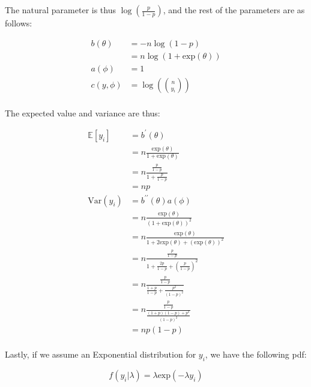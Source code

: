 \documentclass{report}
\begin{document}
The natural parameter is thus $\log\left(\frac{p}{1-p}\right)$, and the rest of the parameters are as follows:

\begin{equation}\label{eq:ex-glm-binomial-dist-params}
    \begin{aligned}
        b(\theta)
          &= -n \log(1 - p) \\
          &= n \log(1 + \text{exp}(\theta)) \\
        a(\phi) &= 1 \\
        c(y, \phi) &= \log\left(\binom{n}{y_i}\right) \\
    \end{aligned}
\end{equation}

The expected value and variance are thus:

\begin{equation}\label{eq:ex-glm-binomial-dist-mean-var}
    \begin{aligned}
        \mathbb{E}[y_i]
          &= b^\prime(\theta) \\
          &= n \frac{\text{exp}(\theta)}{1 + \text{exp}(\theta)} \\
          &= n \frac{\frac{p}{1-p}}{1 + \frac{p}{1-p}} \\
          &= np \\
        \text{Var}(y_i)
          &= b^{\prime\prime}(\theta)a(\phi) \\
          &= n \frac{\text{exp}(\theta)}{(1 + \text{exp}(\theta))^2} \\
          &= n \frac{\text{exp}(\theta)}{1 + 2\text{exp}(\theta) + (\text{exp}(\theta))^2} \\
          &= n \frac{\frac{p}{1-p}}{1 + \frac{2p}{1-p} + \left(\frac{p}{1-p}\right)^2} \\
          &= n \frac{\frac{p}{1-p}}{\frac{1+p}{1-p} + \frac{p^2}{(1-p)^2}} \\
          &= n \frac{\frac{p}{1-p}}{\frac{(1+p)(1-p) + p^2}{(1-p)^2}} \\
          &= np(1-p) \\
    \end{aligned}
\end{equation}

Lastly, if we assume an Exponential distribution for $y_i$, we have the following \gls{pdf}:

\begin{equation}\label{eq:ex-glm-excponential-dist}
    f(y_i|\lambda) = \lambda\text{exp}(-\lambda y_i)
\end{equation}
\end{document}
